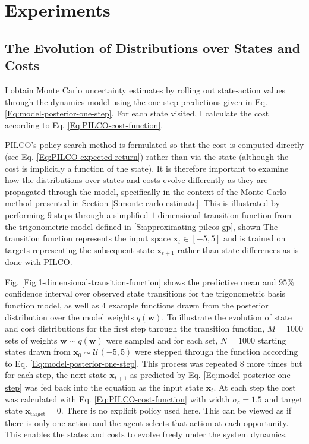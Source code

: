 \section{Experiments}
\label{S:results}
\subsection{The Evolution of Distributions over States and Costs}
I obtain Monte Carlo uncertainty estimates by rolling out state-action values through the dynamics model using the one-step predictions given in Eq. \ref{Eq:model-posterior-one-step}. For each state visited, I calculate the cost according to Eq. \ref{Eq:PILCO-cost-function}. 

PILCO's policy search method is formulated so that the cost is computed directly (see Eq. \ref{Eq:PILCO-expected-return}) rather than via the state (although the cost is implicitly a function of the state). It is therefore important to examine how the distributions over states and costs evolve differently as they are propagated through the model, specifically in the context of the Monte-Carlo method presented in Section \ref{S:monte-carlo-estimate}. This is illustrated by performing $9$ steps through a simplified $1$-dimensional transition function from the trigonometric model defined in \ref{S:approximating-pilcos-gp}, shown  The transition function represents the input space $\mathbf{x}_{t}\in [-5, 5]$ and is trained on targets representing the subsequent state $\mathbf{x}_{t+1}$ rather than state differences as is done with PILCO. 

Fig. \ref{Fig:1-dimensional-transition-function} shows the predictive mean and $95\%$ confidence interval over observed state transitions for the trigonometric basis function model, as well as $4$ example functions drawn from the posterior distribution over the model weights $q(\mathbf{w})$. To illustrate the evolution of state and cost distributions for the first step through the transition function, $M=1000$ sets of weights $\mathbf{w} \sim q(\mathbf{w})$ were sampled and for each set, $N=1000$ starting states drawn from $\mathbf{x}_{0} \sim \mathcal{U}(-5,5)$ were stepped through the function according to Eq. \ref{Eq:model-posterior-one-step}. This process was repeated $8$ more times but for each step, the next state $\mathbf{x}_{t+1}$ as predicted by Eq. \ref{Eq:model-posterior-one-step} was fed back into the equation as the input state $\mathbf{x}_{t}$. At each step the cost was calculated with Eq. \ref{Eq:PILCO-cost-function} with width $\sigma_{c}=1.5$ and target state $\mathbf{x}_{\text{target}}=0$. There is no explicit policy used here. This can be viewed as if there is only one action and the agent selects that action at each opportunity. This enables the states and costs to evolve freely under the system dynamics.

